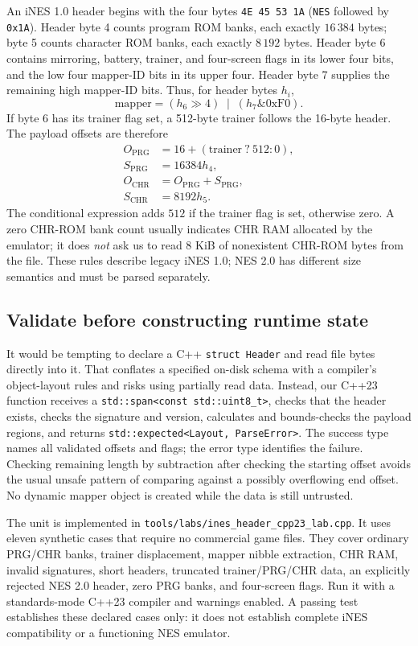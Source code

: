 An iNES 1.0 header begins with the four bytes
\texttt{4E 45 53 1A} (\texttt{NES} followed by \texttt{0x1A}).
Header byte 4 counts program ROM banks, each exactly $16\,384$ bytes;
byte 5 counts character ROM banks, each exactly $8\,192$ bytes.
Header byte 6 contains mirroring, battery, trainer, and four-screen flags
in its lower four bits, and the low four mapper-ID bits in its upper four.
Header byte 7 supplies the remaining high mapper-ID bits. Thus, for
header bytes $h_i$,
\[
\mathrm{mapper}=(h_6\gg4)\;\mathbin{|}\;(h_7\mathbin{\&}\mathrm{0xF0}).
\]
If byte 6 has its trainer flag set, a 512-byte trainer follows the 16-byte
header. The payload offsets are therefore
\[
\begin{aligned}
O_{\mathrm{PRG}} &= 16 + (\mathrm{trainer}\ ?\ 512:0),\\
S_{\mathrm{PRG}} &= 16384h_4,\\
O_{\mathrm{CHR}} &= O_{\mathrm{PRG}} + S_{\mathrm{PRG}},\\
S_{\mathrm{CHR}} &= 8192h_5.
\end{aligned}
\]
The conditional expression adds $512$ if the trainer flag is set, otherwise
zero. A zero CHR-ROM bank count usually indicates CHR RAM allocated by the
emulator; it does \emph{not} ask us to read 8 KiB
of nonexistent CHR-ROM bytes from the file. These rules describe legacy
iNES 1.0; NES 2.0 has different size semantics and must be parsed separately.

\subsection{Validate before constructing runtime state}

It would be tempting to declare a C++ \texttt{struct Header} and read file
bytes directly into it. That conflates a specified on-disk schema with a
compiler's object-layout rules and risks using partially read data. Instead,
our C++23 function receives a \texttt{std::span<const std::uint8\_t>},
checks that the header exists, checks the signature and version, calculates
and bounds-checks the payload regions, and returns
\texttt{std::expected<Layout, ParseError>}.
The success type names all validated offsets and flags; the error type
identifies the failure. Checking remaining length by subtraction after
checking the starting offset avoids the usual unsafe pattern of comparing
against a possibly overflowing end offset. No dynamic mapper object is
created while the data is still untrusted.

The unit is implemented in \texttt{tools/labs/ines\_header\_cpp23\_lab.cpp}.
It uses eleven synthetic cases that require no commercial game files. They
cover ordinary PRG/CHR banks, trainer displacement, mapper nibble extraction,
CHR RAM, invalid signatures, short headers, truncated trainer/PRG/CHR data,
an explicitly rejected NES 2.0 header, zero PRG banks, and four-screen flags.
Run it with a standards-mode C++23 compiler and warnings enabled. A passing
test establishes these declared cases only: it does not establish complete
iNES compatibility or a functioning NES emulator.

